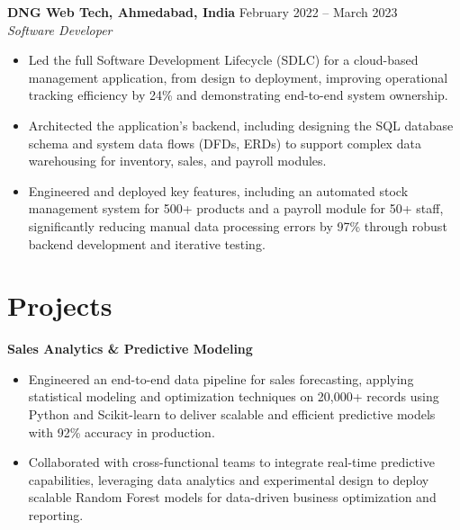 \documentclass[a4paper,10pt]{article}
\begin{document}
\textbf{DNG Web Tech, Ahmedabad, India} \hfill February 2022 -- March 2023 \\
\textit{Software Developer} \\

\begin{itemize}[leftmargin=*, itemsep=0pt, parsep=1pt] %
\vspace{-7mm}
    \item Led the full Software Development Lifecycle (SDLC) for a cloud-based management application, from design to deployment, improving operational tracking efficiency by 24\% and demonstrating end-to-end system ownership.
\item Architected the application's backend, including designing the SQL database schema and system data flows (DFDs, ERDs) to support complex data warehousing for inventory, sales, and payroll modules.
\item Engineered and deployed key features, including an automated stock management system for 500+ products and a payroll module for 50+ staff, significantly reducing manual data processing errors by 97\% through robust backend development and iterative testing. 

\end{itemize}

\vspace{-4mm}

\section*{Projects}
\textbf{Sales Analytics \& Predictive Modeling} \\
\begin{itemize}[leftmargin=*, itemsep=0pt, parsep=1pt]
\vspace{-7mm}
    \item Engineered an end-to-end data pipeline for sales forecasting, applying statistical modeling and optimization techniques on 20,000+ records using Python and Scikit-learn to deliver scalable and efficient predictive models with 92\% accuracy in production.
    \item Collaborated with cross-functional teams to integrate real-time predictive capabilities, leveraging data analytics and experimental design to deploy scalable Random Forest models for data-driven business optimization and reporting.
    \end{itemize}
\end{document}
